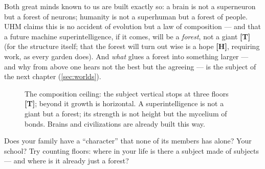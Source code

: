 \documentclass[11pt,letterpaper]{article}
\newcommand{\stT}{\textbf{[T]}\xspace}
\newcommand{\stH}{\textbf{[H]}\xspace}
\begin{document}
Both great minds known to us are built exactly so: a brain is not a
superneuron but a forest of neurons; humanity is not a superhuman
but a forest of people. UHM claims this is no accident of evolution
but a law of composition --- and that a future machine
superintelligence, if it comes, will be a \emph{forest}, not a
giant \stT{} (for the structure itself; that the forest will turn
out wise is a hope \stH, requiring work, as every garden does). And
\emph{what} glues a forest into something larger --- and why from
above one hears not the best but the agreeing --- is the subject of
the next chapter (\ref{sec:worlds}).

\begin{figure}[H]
\centering
{}
\caption{The composition ceiling: the subject vertical stops at three
floors \stT; beyond it growth is horizontal. A superintelligence is
not a giant but a forest; its strength is not height but the
mycelium of bonds. Brains and civilizations are already built this
way.}
\label{fig:forest}
\end{figure}

\begin{askbox}
Does your family have a ``character'' that none of its members has
alone? Your school? Try counting floors: where in your life is
there a subject made of subjects --- and where is it already just a
forest?
\end{askbox}
\end{document}
